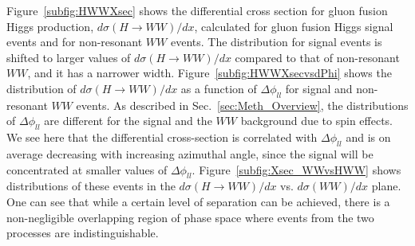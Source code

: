 Figure~\ref{subfig:HWWXsec} shows the differential cross section for gluon fusion Higgs production,
$d\sigma(H \rightarrow WW)/dx$, calculated for gluon fusion Higgs signal events and for non-resonant $WW$ events.
The distribution for signal events is shifted to larger values of  $d\sigma(H \rightarrow WW)/dx$ compared to that
of non-resonant $WW$, and it has a narrower width. 
Figure~\ref{subfig:HWWXsecvsdPhi} shows the distribution of $d\sigma(H \rightarrow WW)/dx$ as a function of
$\Delta\phi_{ll}$ for signal and non-resonant $WW$ events.
As described in Sec.~\ref{sec:Meth_Overview}, the distributions of $\Delta\phi_{ll}$ are different for the signal and the $WW$
background due to spin effects. We see here that the differential cross-section is correlated with $\Delta\phi_{ll}$ and is on average decreasing with
increasing azimuthal angle, since the signal will be concentrated at smaller values of $\Delta\phi_{ll}$.
Figure~\ref{subfig:Xsec_WWvsHWW} shows distributions of these events in the $d\sigma(H \rightarrow WW)/dx$ 
vs. $d\sigma(WW)/dx$ plane. One can see that while a certain level of separation can be achieved, there is a 
non-negligible overlapping region of phase space where events from the two processes are indistinguishable.

